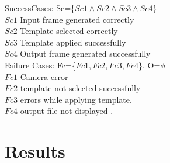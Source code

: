\noindent SuccessCases: Sc=\{$Sc1\wedge Sc2 \wedge Sc3 \wedge Sc4$\}\\
$Sc1$ Input frame generated correctly\\
$Sc2$ Template selected correctly\\
$Sc3$ Template applied successfully\\
$Sc4$ Output frame generated successfully\\

\noindent Failure Cases: Fc=\{$Fc1,Fc2,Fc3, Fc4$\}, O=$\phi$\\
$Fc1$ Camera error\\
$Fc2$ template not selected successfully\\
$Fc3$ errors while applying template.\\
$Fc4$ output file not displayed .
\clearpage
\section{Results}

\clearpage
